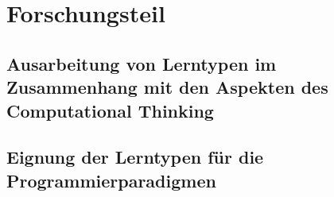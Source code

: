 \clearpage
\section{Forschungsteil}
\label{sec:work}

\subsection{Ausarbeitung von Lerntypen im Zusammenhang mit den Aspekten des Computational Thinking}

\subsection{Eignung der Lerntypen für die Programmierparadigmen}